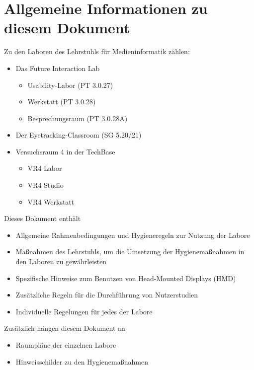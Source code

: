 \section{Allgemeine Informationen zu diesem Dokument}

Zu den Laboren des Lehrstuhls für Medieninformatik zählen:

\begin{itemize}
    \item Das Future Interaction Lab
    \begin{itemize}
        \item Usability-Labor (PT 3.0.27)
        \item Werkstatt (PT 3.0.28)
        \item Besprechungsraum (PT 3.0.28A)
    \end{itemize}
    \item Der Eyetracking-Classroom (SG 5.20/21)
    \item Versuchsraum 4 in der TechBase
    \begin{itemize}
        \item VR4 Labor
        \item VR4 Studio
        \item VR4 Werkstatt
    \end{itemize}
\end{itemize}

\noindent
Dieses Dokument enthält

\begin{itemize}
    \item Allgemeine Rahmenbedingungen und Hygieneregeln zur Nutzung der Labore
    \item Maßnahmen des Lehrstuhls, um die Umsetzung der Hygienemaßnahmen in den Laboren zu gewährleisten
    \item Spezifische Hinweise zum Benutzen von Head-Mounted Displays (HMD)
    \item Zusätzliche Regeln für die Durchführung von Nutzerstudien
    \item Individuelle Regelungen für jedes der Labore
\end{itemize}

\noindent
Zusätzlich hängen diesem Dokument an

\begin{itemize}
    \item Raumpläne der einzelnen Labore
    \item Hinweisschilder zu den Hygienemaßnahmen
\end{itemize}
